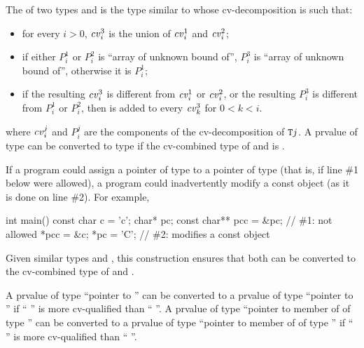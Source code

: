 \pnum
The  of two types  and 
is the type 
similar to  whose cv-decomposition is such that:
\begin{itemize}
\item
for every $i > 0$, $\cv{}^3_i$ is the union of
$\cv{}^1_i$ and $\cv{}^2_i$;
\item
if either $P^1_i$ or $P^2_i$ is ``array of unknown bound of'',
$P^3_i$ is ``array of unknown bound of'', otherwise it is $P^1_i$;
\item
if the resulting $\cv{}^3_i$ is different from $\cv{}^1_i$ or $\cv{}^2_i$,
or the resulting $P^3_i$ is different from $P^1_i$ or $P^2_i$,
then  is added to every $\cv{}^3_k$ for $0 < k < i$.
\end{itemize}
where $\cv{}^j_i$ and $P^j_i$ are the components of
the cv-decomposition of $\texttt{T}j$.
A prvalue of type 
can be converted to type 
if the cv-combined type of  and  is .
\begin{note}
If a program could assign a pointer of type  to a pointer of
type   (that is, if line \#1 below were
allowed), a program could inadvertently modify a const object
(as it is done on line \#2). For example,
\begin{codeblock}
int main() {
  const char c = 'c';
  char* pc;
  const char** pcc = &pc;       // \#1: not allowed
  *pcc = &c;
  *pc = 'C';                    // \#2: modifies a const object
}
\end{codeblock}
\end{note}
\begin{note}
Given similar types  and , this
construction ensures that
both can be converted to the cv-combined type of  and .
\end{note}

\pnum
\begin{note}
A prvalue of type ``pointer to  '' can be
converted to a prvalue of type ``pointer to  '' if
`` '' is more cv-qualified than ``
''.
A prvalue of type ``pointer to member of  of type 
'' can be converted to a prvalue of type ``pointer to member
of  of type  '' if ``
'' is more cv-qualified than `` ''.
\end{note}

